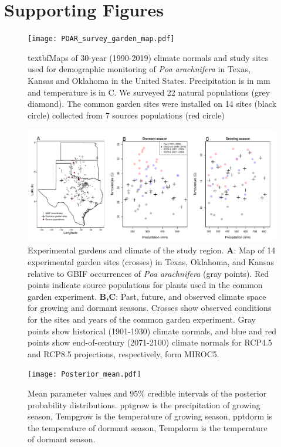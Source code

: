 \documentclass[9pt,twoside,lineno]{pnas-new}
\begin{document}
\section*{Supporting Figures}
\begin{figure}[H]
\centering
\texttt{[image: POAR\_survey\_garden\_map.pdf]}
\caption{textbf{Maps of 30-year (1990-2019) climate normals and study sites used for demographic monitoring of \emph{Poa arachnifera} in Texas, Kansas and Oklahoma in the United States}.
 Precipitation is in mm and temperature is in \degree  C.
 We surveyed 22 natural populations (grey diamond).
 The common garden sites were installed on 14 sites (black circle) collected from 7 sources populations (red circle)}
 \label{Sup:long_lat_garden}
\end{figure}
\clearpage

\begin{figure}
\centering
\includegraphics[width=\textwidth]{tom_map_v2.pdf}
\caption{ Experimental gardens and climate of the study region. 
  	\textbf{A}: Map of 14 experimental garden sites (crosses) in Texas, Oklahoma, and Kansas relative to GBIF occurrences of \textit{Poa arachnifera} (gray points). Red points indicate source populations for plants used in the common garden experiment. 
  	\textbf{B,C}: Past, future, and observed climate space for growing and dormant seasons. Crosses show observed conditions for the sites and years of the common garden experiment. Gray points show historical (1901-1930) climate normals, and blue and red points show end-of-century (2071-2100) climate normals for RCP4.5 and RCP8.5 projections, respectively, form MIROC5.
}
\label{Sup:climate_variation1}
\end{figure}
\clearpage

\begin{figure}
\centering
\texttt{[image: Posterior\_mean.pdf]}
\caption{Mean parameter values and 95\% credible intervals of the posterior probability distributions. 
		pptgrow is  the precipitation of growing season,
		Tempgrow is the temperature of growing season,
		pptdorm is the temperature of dormant season,
		Tempdorm is the temperature of dormant season.}
\label{Sup:Posterior}
\end{figure}
\clearpage
\end{document}
